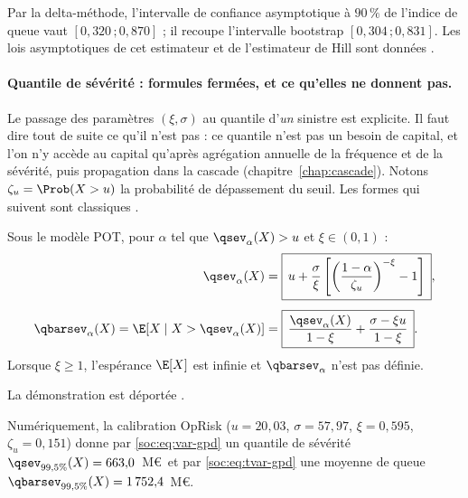 \noindent Par la delta-méthode, l'intervalle de confiance asymptotique à $90\,\%$ de l'indice de
queue vaut $[0{,}320\,;0{,}870]$ ; il recoupe l'intervalle bootstrap $[0{,}304\,;0{,}831]$. Les
lois asymptotiques de cet estimateur et de l'estimateur de Hill sont données
\matcomp.

\paragraph{Quantile de sévérité : formules fermées, et ce qu'elles ne donnent pas.} Le passage des paramètres $(\xi,\sigma)$ au quantile d'\emph{un} sinistre est explicite. Il faut dire tout de suite ce qu'il n'est pas : ce quantile n'est pas un besoin de capital, et l'on n'y accède au capital qu'après agrégation annuelle de la fréquence et de la sévérité, puis propagation dans la cascade (chapitre~\ref{chap:cascade}). Notons $\zeta_u=\Prob(X>u)$ la probabilité de dépassement du seuil. Les formes qui suivent sont
classiques \citep{mcneil2015}.

\begin{proposition}%
Sous le modèle POT, pour $\alpha$ tel que $\qsev_\alpha(X)>u$ et $\xi\in(0,1)$ :
\begin{align}
\qsev_\alpha(X) &= \boxed{\,u + \frac{\sigma}{\xi}\left[\left(\frac{1-\alpha}{\zeta_u}\right)^{-\xi}-1\right]\,},%
\\[4pt]
\qbarsev_\alpha(X) = \E[X\mid X>\qsev_\alpha(X)] &= \boxed{\,\frac{\qsev_\alpha(X)}{1-\xi}+\frac{\sigma-\xi u}{1-\xi}\,}.%
\end{align}
Lorsque $\xi\ge 1$, l'espérance $\E[X]$ est infinie et $\qbarsev_\alpha$ n'est pas définie.
\end{proposition}

\noindent La démonstration est déportée \matcomp.

\noindent Numériquement, la calibration OpRisk ($u=20{,}03$, $\sigma=57{,}97$, $\xi=0{,}595$, $\zeta_u=0{,}151$) donne par \eqref{soc:eq:var-gpd} un quantile de sévérité $\qsev_{99{,}5\%}(X)=663{,}0$~M\euro\ et par \eqref{soc:eq:tvar-gpd} une moyenne de queue $\qbarsev_{99{,}5\%}(X)=1\,752{,}4$~M\euro.

